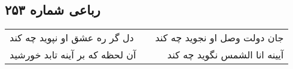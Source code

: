 \begin{center}
\section*{رباعی شماره ۲۵۳}
\label{sec:sh253}
\begin{longtable}{l p{0.5cm} r}
دل گر ره عشق او نپوید چه کند
&&
جان دولت وصل او نجوید چه کند
\\
آن لحظه که بر آینه تابد خورشید
&&
آیینه انا الشمس نگوید چه کند
\\
\end{longtable}
\end{center}
